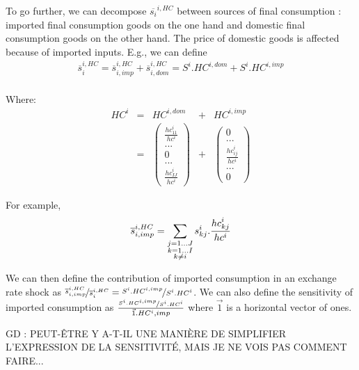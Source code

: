 \documentclass[11pt,a4paper]{article}
\begin{document}
To go further, we can decompose $\overline{s_{i}}^{i,HC}$ between sources of final consumption : imported final consumption goods on the one hand and domestic final consumption goods on the other hand. The price of domestic goods is affected because of imported inputs. E.g., we can define 
\begin{eqnarray}
\overline{s}_i^{i,HC}=\overline{s}_{i,imp}^{i,HC} + \overline{s}_{i,dom}^{i,HC} = S^i.HC^{i,dom}+ S^i.HC^{i,imp}\\
\end{eqnarray}

Where:
\begin{equation}
\begin{array}{ccccc}
HC^i&=&HC^{i,dom} & + &  HC^{i,imp} \\ &=&
\left( 	\begin{array}{c} \frac{{hc}_{11}^i}{hc^i} \\	...\\0\\...\\\frac{{hc}_{IJ}^i}{hc^i}\end{array}\right) 
&+& \left( \begin{array}{c}
	0 \\
	...\\
	\frac{{hc}_{ij}^i}{hc^i}\\
	...\\
	0
	 \end{array}
	 \right)
\end{array}
\end{equation}

For example,
\begin{equation}
\overline{s}_{i,imp}^{i,HC} = \underset{\begin{subarray}{c}j=1 \dots J   \\ k=1 \dots I \\ k \neq i \end{subarray}}{\mathop \sum}\,{{s}_{kj}^i}.\frac{{hc}_{kj}^i}{hc^i}
\label{equ:share_of_imported}
 \end{equation}

We can then define the contribution of imported consumption in an exchange rate shock as $\nicefrac{\overline{s}_{i,imp}^{i,HC}}{\overline{s}_{i}^{i,HC}} = \nicefrac{S^i.HC^{i,imp}}{S^i.HC^{i}}$. We can also define the sensitivity of imported consumption as $ \frac{\nicefrac{S^i.HC^{i,imp}}{S^i.HC^{i}}}{\vec{1}.HC^i,imp}$ where $\vec 1$ is a horizontal vector of ones.

GD : PEUT-ÊTRE Y A-T-IL UNE MANIÈRE DE SIMPLIFIER L'EXPRESSION DE LA SENSITIVITÉ, MAIS JE NE VOIS PAS COMMENT FAIRE...
\end{document}
